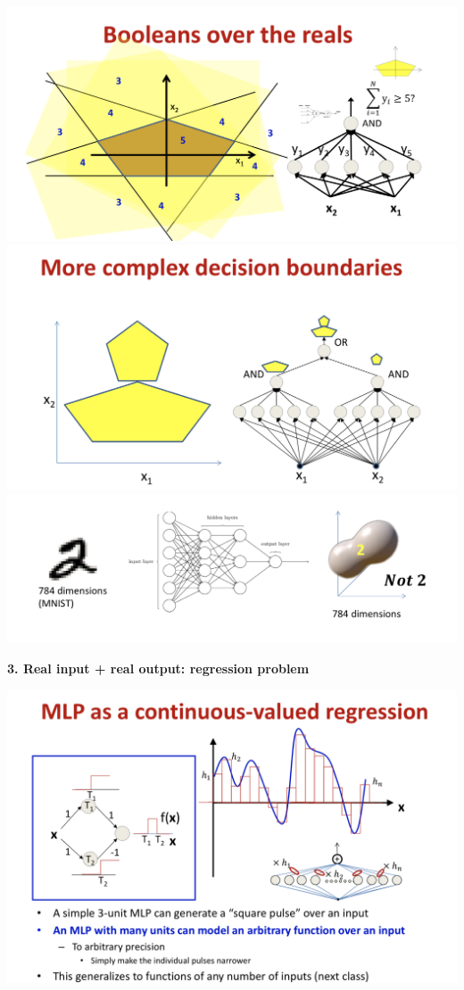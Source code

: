\documentclass{article}
\begin{document}
	\includegraphics[scale=0.2]{7.png}
	\includegraphics[scale=0.2]{8.png}
	\includegraphics[scale=0.2]{9.png}
	
	
	\textbf{3. Real input + real output: regression problem}
	
	
		\includegraphics[scale=0.2]{10.png}
		
\end{document}
